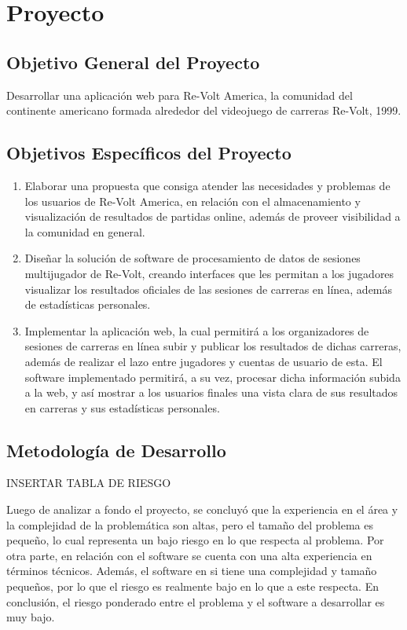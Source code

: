 \chapter{Proyecto}

\section{Objetivo General del Proyecto}
Desarrollar una aplicación web para Re-Volt America, la comunidad del continente americano formada alrededor del videojuego de carreras Re-Volt, 1999.

\section{Objetivos Específicos del Proyecto}
\begin{enumerate}
	\item Elaborar una propuesta que consiga atender las necesidades y problemas de los usuarios de Re-Volt America, en relación con el almacenamiento y visualización de resultados de partidas online, además de proveer visibilidad a la comunidad en general.
	\item Diseñar la solución de software de procesamiento de datos de sesiones multijugador de Re-Volt, creando interfaces que les permitan a los jugadores visualizar los resultados oficiales de las sesiones de carreras en línea, además de estadísticas personales.
	\item Implementar la aplicación web, la cual permitirá a los organizadores de sesiones de carreras en línea subir y publicar los resultados de dichas carreras, además de realizar el lazo entre jugadores y cuentas de usuario de esta. El software implementado permitirá, a su vez, procesar dicha información subida a la web, y así mostrar a los usuarios finales una vista clara de sus resultados en carreras y sus estadísticas personales.
\end{enumerate}

\section{Metodología de Desarrollo}

INSERTAR TABLA DE RIESGO

Luego de analizar a fondo el proyecto, se concluyó que la experiencia en el área y la complejidad de la problemática son altas, pero el tamaño del problema es pequeño, lo cual representa un bajo riesgo en lo que respecta al problema. Por otra parte, en relación con el software se cuenta con una alta experiencia en términos técnicos. Además, el software en si tiene una complejidad y tamaño pequeños, por lo que el riesgo es realmente bajo en lo que a este respecta. En conclusión, el riesgo ponderado entre el problema y el software a desarrollar es muy bajo.

